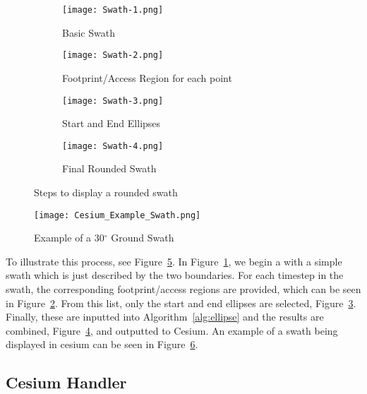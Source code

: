 \begin{description}
\begin{figure}
    \centering
    \begin{subfigure}[b]{0.45\textwidth}
	\texttt{[image: Swath-1.png]} 
	\caption{Basic Swath}
	\label{fig:swath-1}
    \end{subfigure}
    \hfill
    \begin{subfigure}[b]{0.45\textwidth}
	\texttt{[image: Swath-2.png]} 
	\caption{Footprint/Access Region for each point}
	\label{fig:swath-2}
    \end{subfigure}
    \begin{subfigure}[b]{0.45\textwidth}
	\texttt{[image: Swath-3.png]} 
	\caption{Start and End Ellipses}
	\label{fig:swath-3}
    \end{subfigure}
    \hfill
    \begin{subfigure}[b]{0.45\textwidth}
	\texttt{[image: Swath-4.png]} 
	\caption{Final Rounded Swath}
	\label{fig:swath-4}
    \end{subfigure}

    \caption{Steps to display a rounded swath}
    \label{fig:swath-steps}
\end{figure}


\begin{figure}[h]
    \centering
    \texttt{[image: Cesium\_Example\_Swath.png]} 
    \caption{Example of a 30$^\circ$ Ground Swath}
    \label{fig:cesium_swath}
\end{figure} 

To illustrate this process, see Figure~\ref{fig:swath-steps}.  In
Figure~\ref{fig:swath-1}, we begin a with a simple swath which is just
described by the two boundaries. For each timestep in the swath, the
corresponding footprint/access regions are provided, which can be seen in
Figure~\ref{fig:swath-2}.  From this list, only the start and end ellipses are
selected, Figure~\ref{fig:swath-3}. Finally, these are inputted into
Algorithm~\ref{alg:ellipse} and the results are combined,
Figure~\ref{fig:swath-4}, and outputted to Cesium. An example of a swath being
displayed in cesium can be seen in Figure~\ref{fig:cesium_swath}. 

\end{description}


\subsection{Cesium Handler}

